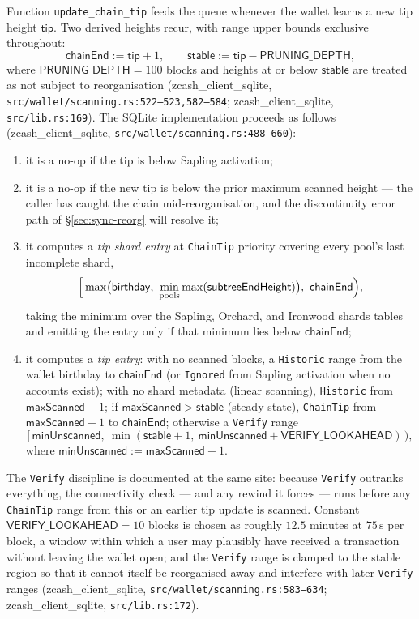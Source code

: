 \documentclass[11pt,a4paper]{article}
\theoremstyle{definition}
\begin{document}
Function \texttt{update\_chain\_tip} feeds the queue whenever the wallet
learns a new tip height $\mathsf{tip}$. Two derived heights recur, with
range upper bounds exclusive throughout:
\[
\mathsf{chainEnd} := \mathsf{tip} + 1, \qquad
\mathsf{stable} := \mathsf{tip} - \mathsf{PRUNING\_DEPTH},
\]
where $\mathsf{PRUNING\_DEPTH} = 100$ blocks and heights at or below
$\mathsf{stable}$ are treated as not subject to reorganisation
(\textsf{zcash\_client\_sqlite},
\texttt{src/wallet/scanning.rs:522--523,582--584};
\textsf{zcash\_client\_sqlite}, \texttt{src/lib.rs:169}). The SQLite
implementation
proceeds as follows
(\textsf{zcash\_client\_sqlite}, \texttt{src/wallet/scanning.rs:488--660}):
\begin{enumerate}[label=(\alph*)]
\item it is a no-op if the tip is below Sapling activation;
\item it is a no-op if the new tip is below the prior maximum scanned
  height --- the caller has caught the chain mid-reorganisation, and the
  discontinuity error path of \S\ref{sec:sync-reorg} will resolve it;
\item it computes a \emph{tip shard entry} at \texttt{ChainTip} priority
  covering every pool's last incomplete shard,
  \[
  \Bigl[\,\max\bigl(\mathsf{birthday},\
  \min_{\text{pools}} \max(\mathsf{subtreeEndHeight})\bigr),\
  \mathsf{chainEnd}\Bigr),
  \]
  taking the minimum over the Sapling, Orchard, and Ironwood shards tables
  and emitting the entry only if that minimum lies below
  $\mathsf{chainEnd}$;
\item it computes a \emph{tip entry}: with no scanned blocks, a
  \texttt{Historic} range from the wallet birthday to $\mathsf{chainEnd}$
  (or \texttt{Ignored} from Sapling activation when no accounts exist);
  with no shard metadata (linear scanning), \texttt{Historic} from
  $\mathsf{maxScanned} + 1$; if $\mathsf{maxScanned} > \mathsf{stable}$
  (steady state), \texttt{ChainTip} from $\mathsf{maxScanned} + 1$ to
  $\mathsf{chainEnd}$; otherwise a \texttt{Verify} range
  \[
  \bigl[\,\mathsf{minUnscanned},\
  \min(\mathsf{stable} + 1,\ \mathsf{minUnscanned} +
  \mathsf{VERIFY\_LOOKAHEAD})\,\bigr),
  \]
  where $\mathsf{minUnscanned} := \mathsf{maxScanned} + 1$.
\end{enumerate}

The \texttt{Verify} discipline is documented at the same site: because
\texttt{Verify} outranks everything, the connectivity check --- and any
rewind it forces --- runs before any \texttt{ChainTip} range from this or
an earlier tip update is scanned. Constant
$\mathsf{VERIFY\_LOOKAHEAD} = 10$ blocks is chosen as roughly $12.5$
minutes at $75\,\mathrm{s}$ per block, a window within which a user may
plausibly have received a transaction without leaving the wallet open; and
the \texttt{Verify} range is clamped to the stable region so that it cannot
itself be reorganised away and interfere with later \texttt{Verify} ranges
(\textsf{zcash\_client\_sqlite}, \texttt{src/wallet/scanning.rs:583--634};
\textsf{zcash\_client\_sqlite}, \texttt{src/lib.rs:172}).
\end{document}
